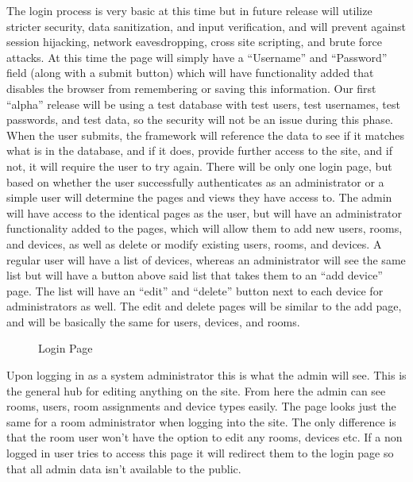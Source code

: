 \documentclass{report}
\begin{document}
The login process is very basic at this time but in future release will utilize stricter security, data sanitization, and input verification,
and will prevent against session hijacking, network eavesdropping, cross site scripting, and brute force attacks. 
At this time the page will simply have a “Username” and “Password” field (along with a submit button) which will have functionality
added that disables the browser from remembering or saving this information. 
Our first “alpha” release will be using a test database with test users, test usernames, test passwords, and test data, so the security
will not be an issue during this phase. When the user submits, the framework will reference the data to see if it matches what is in the database, and if it does, provide further access to the site, and if not, it will require the user to try again. 
\newline
\indent
There will be only one login page, but based on whether the user successfully authenticates as an administrator or a simple user will determine the pages and views they have access to. 
The admin will have access to the identical pages as the user, but will have an administrator functionality added to the pages, which will allow them to add new users, rooms, and devices, as well as delete or modify existing users, rooms, and devices. 
A regular user will have a list of devices, whereas an administrator will see the same list but will have a button above said list that takes them to an “add device” page.  
The list will have an “edit” and “delete” button next to each device for administrators as well. The edit and delete pages will be similar to the add page, and will be basically the same for users, devices, and rooms. 
\begin{figure}[H]
\caption{Login Page}
\end{figure}
\newpage

Upon logging in as a system administrator this is what the admin will see.
This is the general hub for editing anything on the site.
From here the admin can see rooms, users, room assignments and device types easily.
The page looks just the same for a room administrator when logging into the site. 
The only difference is that the room user won't have the option to edit any rooms, devices etc.
If a non logged in user tries to access this page it will redirect them to the login page so that all admin data isn't available to the public.
\end{document}
